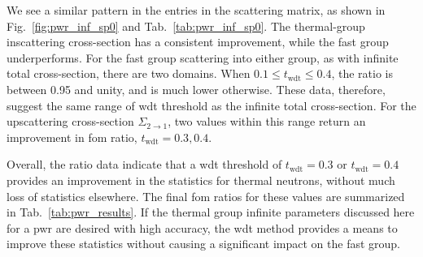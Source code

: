 We see a similar pattern in the entries in the scattering matrix, as
shown in Fig.~\ref{fig:pwr_inf_sp0} and
Tab.~\ref{tab:pwr_inf_sp0}. The thermal-group inscattering cross-section
has a consistent improvement, while the fast group underperforms. For
the fast group scattering into either group, as with infinite total
cross-section, there are two domains. When
$0.1 \leq t_{\mathrm{wdt}} \leq 0.4$, the ratio is between 0.95 and
unity, and is much lower otherwise. These data, therefore, suggest the
same range of \gls{wdt} threshold as the infinite total
cross-section. For the upscattering cross-section $\Sigma_{2 \to 1}$,
two values within this range return an improvement in \gls{fom} ratio,
$t_\mathrm{wdt} = 0.3, 0.4$.

Overall, the ratio data indicate that a \gls{wdt} threshold of
$t_{\mathrm{wdt}} = 0.3$ or $t_{\mathrm{wdt}} = 0.4$ provides an
improvement in the statistics for thermal neutrons, without much loss
of statistics elsewhere. The final \gls{fom} ratios for these values
are summarized in Tab.~\ref{tab:pwr_results}. If the thermal group
infinite parameters discussed here for a \gls{pwr} are desired with
high accuracy, the \gls{wdt} method provides a means to improve these
statistics without causing a significant impact on the fast group.

